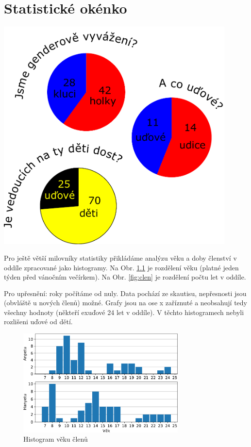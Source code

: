 \chapter{Statistické okénko}
\label{statistika}

\begin{center}

\includegraphics[width=12cm]{img/statistika/grafy-kolacove.pdf}

\end{center}


\clearpage

Pro ještě větší milovníky statistiky přikládáme analýzu věku a doby členství v oddíle zpracované jako histogramy. Na Obr. \ref{fig:vek} je rozdělení věku (platné jeden týden před vánočním večírkem). Na Obr. \ref{fig:clen} je rozdělení počtu let v oddíle.

Pro upřesnění: roky počítáme od nuly. Data pochází ze skautisu, nepřesnosti jsou (obvláště u nových členů) možné. Grafy jsou na ose x zaříznuté a neobsahují tedy všechny hodnoty (někteří exuďové 24 let v oddíle). V těchto histogramech nebyli rozlišeni uďové od dětí.

\begin{figure}[!ht]
  \begin{center}
    \includegraphics[width=0.75\textwidth]{statistika/hist_vek-crop.pdf}
  \end{center}
  \vspace*{-10pt}
  \caption{Histogram věku členů}
  \label{fig:vek}
\end{figure}


